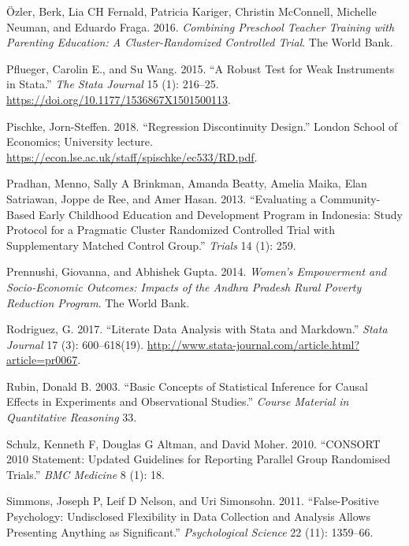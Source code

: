 \documentclass[
]{book}
\begin{document}
\leavevmode\hypertarget{ref-ozler2016combining}{}%
Özler, Berk, Lia CH Fernald, Patricia Kariger, Christin McConnell, Michelle Neuman, and Eduardo Fraga. 2016. \emph{Combining Preschool Teacher Training with Parenting Education: A Cluster-Randomized Controlled Trial}. The World Bank.

\leavevmode\hypertarget{ref-pfluegerwang2015}{}%
Pflueger, Carolin E., and Su Wang. 2015. ``A Robust Test for Weak Instruments in Stata.'' \emph{The Stata Journal} 15 (1): 216--25. \url{https://doi.org/10.1177/1536867X1501500113}.

\leavevmode\hypertarget{ref-pischke2018}{}%
Pischke, Jorn-Steffen. 2018. ``Regression Discontinuity Design.'' London School of Economics; University lecture. \url{https://econ.lse.ac.uk/staff/spischke/ec533/RD.pdf}.

\leavevmode\hypertarget{ref-pradhan2013evaluating}{}%
Pradhan, Menno, Sally A Brinkman, Amanda Beatty, Amelia Maika, Elan Satriawan, Joppe de Ree, and Amer Hasan. 2013. ``Evaluating a Community-Based Early Childhood Education and Development Program in Indonesia: Study Protocol for a Pragmatic Cluster Randomized Controlled Trial with Supplementary Matched Control Group.'' \emph{Trials} 14 (1): 259.

\leavevmode\hypertarget{ref-prennushi2014women}{}%
Prennushi, Giovanna, and Abhishek Gupta. 2014. \emph{Women's Empowerment and Socio-Economic Outcomes: Impacts of the Andhra Pradesh Rural Poverty Reduction Program}. The World Bank.

\leavevmode\hypertarget{ref-pr0067}{}%
Rodriguez, G. 2017. ``Literate Data Analysis with Stata and Markdown.'' \emph{Stata Journal} 17 (3): 600--618(19). \url{http://www.stata-journal.com/article.html?article=pr0067}.

\leavevmode\hypertarget{ref-rubin2003basic}{}%
Rubin, Donald B. 2003. ``Basic Concepts of Statistical Inference for Causal Effects in Experiments and Observational Studies.'' \emph{Course Material in Quantitative Reasoning} 33.

\leavevmode\hypertarget{ref-schulz2010consort}{}%
Schulz, Kenneth F, Douglas G Altman, and David Moher. 2010. ``CONSORT 2010 Statement: Updated Guidelines for Reporting Parallel Group Randomised Trials.'' \emph{BMC Medicine} 8 (1): 18.

\leavevmode\hypertarget{ref-simmons2011false}{}%
Simmons, Joseph P, Leif D Nelson, and Uri Simonsohn. 2011. ``False-Positive Psychology: Undisclosed Flexibility in Data Collection and Analysis Allows Presenting Anything as Significant.'' \emph{Psychological Science} 22 (11): 1359--66.
\end{document}
